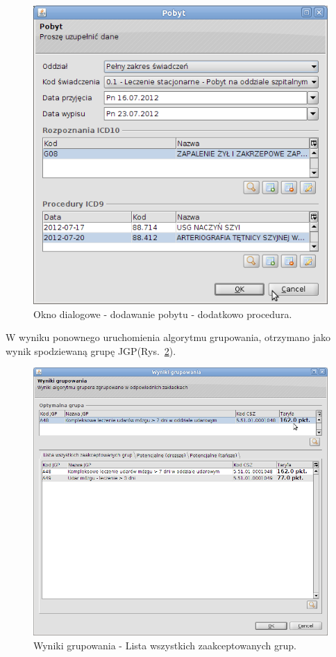\begin{figure}[!ht]
\centering
\includegraphics[scale=0.4]{images/gruper14}
\caption[Widok grupera]{Okno dialogowe - dodawanie pobytu - dodatkowo procedura.}
\label{img:gruper14}
\end{figure}

W wyniku ponownego uruchomienia algorytmu grupowania, otrzymano jako wynik spodziewaną grupę JGP(Rys.~\ref{img:gruper15}).

\begin{figure}%
\centering
\includegraphics[scale=0.4]{images/gruper15}
\caption[Widok grupera]{Wyniki grupowania - Lista wszystkich zaakceptowanych grup.}
\label{img:gruper15}
\end{figure}


